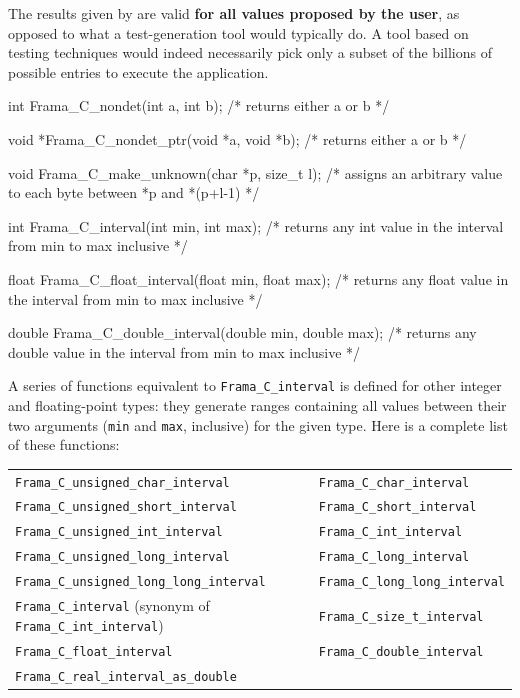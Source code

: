 \documentclass{frama-c-book}
\begin{document}
The results given by
\Eva{} are
valid \textbf{for all values proposed by the user}, as opposed
to what a test-generation tool would typically do. A tool based
on testing techniques
would indeed necessarily pick only a subset of the billions
 of possible entries
to execute the application.

\begin{listing-nonumber}
int Frama_C_nondet(int a, int b);
    /* returns either a or b */

void *Frama_C_nondet_ptr(void *a, void *b);
    /* returns either a or b */

void Frama_C_make_unknown(char *p, size_t l);
    /* assigns an arbitrary value to each byte between *p and *(p+l-1) */

int Frama_C_interval(int min, int max);
    /* returns any int value in the interval from min to max inclusive */

float Frama_C_float_interval(float min, float max);
    /* returns any float value in the interval from min to max inclusive */

double Frama_C_double_interval(double min, double max);
    /* returns any double value in the interval from min to max inclusive */
\end{listing-nonumber}

A series of functions equivalent to \lstinline|Frama_C_interval|
is defined for other integer and floating-point types:
they generate ranges containing all values between their two arguments
(\texttt{min} and \texttt{max}, inclusive) for the given type.
Here is a complete list of these functions:

\begin{table}[!ht]
  \centering
  \begin{tabular}{ll}
    \lstinline|Frama_C_unsigned_char_interval| &
    \lstinline|Frama_C_char_interval| \\
    \lstinline|Frama_C_unsigned_short_interval| &
    \lstinline|Frama_C_short_interval| \\
    \lstinline|Frama_C_unsigned_int_interval| &
    \lstinline|Frama_C_int_interval| \\
    \lstinline|Frama_C_unsigned_long_interval| &
    \lstinline|Frama_C_long_interval| \\
    \lstinline|Frama_C_unsigned_long_long_interval| &
    \lstinline|Frama_C_long_long_interval| \\
    \lstinline|Frama_C_interval| (synonym of \lstinline|Frama_C_int_interval|) &
    \lstinline|Frama_C_size_t_interval| \\
    \lstinline|Frama_C_float_interval| &
    \lstinline|Frama_C_double_interval| \\
    \lstinline|Frama_C_real_interval_as_double|
  \end{tabular}
\end{table}
\end{document}
